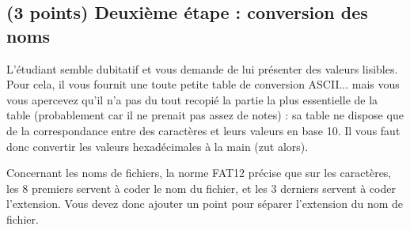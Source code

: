 \documentclass[11pt,a4paper]{article}
\begin{document}
\bigskip

\subsection{(3 points) Deuxième étape : conversion des noms }

L'étudiant semble dubitatif et vous demande de lui présenter des valeurs lisibles.
Pour cela, il vous fournit une toute petite table de conversion ASCII... mais vous vous apercevez qu'il n'a pas du tout recopié la partie la plus essentielle de la table (probablement car il ne prenait pas assez de notes) : sa table ne dispose que de la correspondance entre des caractères et leurs valeurs en base 10.
Il vous faut donc convertir les valeurs hexadécimales à la main (zut alors).

\medskip

Concernant les noms de fichiers, la norme FAT12 précise que sur les caractères, les 8 premiers servent à coder le nom du fichier, et les 3 derniers servent à coder l'extension.
Vous devez donc ajouter un point pour séparer l'extension du nom de fichier.

\medskip
\end{document}
